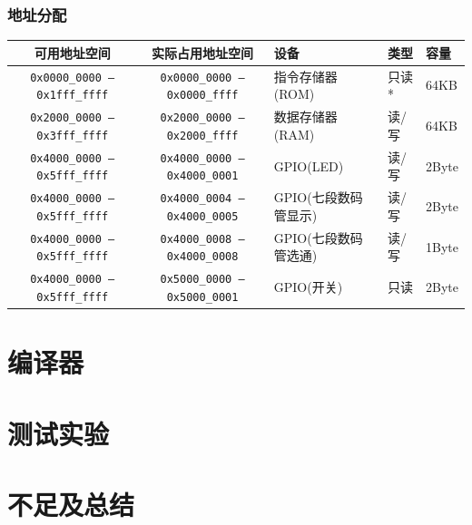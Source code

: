 \documentclass[lang=cn,11pt,a4paper,chinesefont=founder]{elegantpaper}
\begin{document}
\subsubsection{地址分配}
\begin{table}[h!]
    \centering
    \begin{tabular}{cclll}
        \toprule
        可用地址空间                           & 实际占用地址空间                       & 设备                 & 类型  & 容量  \\
        \midrule
        \texttt{0x0000\_0000 --- 0x1fff\_ffff} & \texttt{0x0000\_0000 --- 0x0000\_ffff} & 指令存储器(ROM)      & 只读* & 64KB  \\
        \texttt{0x2000\_0000 --- 0x3fff\_ffff} & \texttt{0x2000\_0000 --- 0x2000\_ffff} & 数据存储器(RAM)      & 读/写 & 64KB  \\
        \texttt{0x4000\_0000 --- 0x5fff\_ffff} & \texttt{0x4000\_0000 --- 0x4000\_0001} & GPIO(LED)            & 读/写 & 2Byte \\
        \texttt{0x4000\_0000 --- 0x5fff\_ffff} & \texttt{0x4000\_0004 --- 0x4000\_0005} & GPIO(七段数码管显示) & 读/写 & 2Byte \\
        \texttt{0x4000\_0000 --- 0x5fff\_ffff} & \texttt{0x4000\_0008 --- 0x4000\_0008} & GPIO(七段数码管选通) & 读/写 & 1Byte \\
        \texttt{0x4000\_0000 --- 0x5fff\_ffff} & \texttt{0x5000\_0000 --- 0x5000\_0001} & GPIO(开关)           & 只读  & 2Byte \\
        \bottomrule
    \end{tabular}
\end{table}
\section{编译器}

\section{测试实验}
\section{不足及总结}
\end{document}
